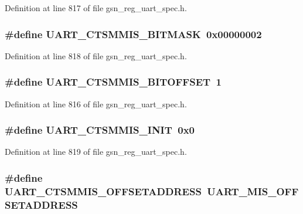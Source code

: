 Definition at line 817 of file gsn\_\-reg\_\-uart\_\-spec.h.

\hypertarget{a00575_a4deb46f192974dde0fb7988e926939ac}{
\subsubsection[{UART\_\-CTSMMIS\_\-BITMASK}]{\setlength{\rightskip}{0pt plus 5cm}\#define UART\_\-CTSMMIS\_\-BITMASK~0x00000002}}
\label{a00575_a4deb46f192974dde0fb7988e926939ac}


Definition at line 818 of file gsn\_\-reg\_\-uart\_\-spec.h.

\hypertarget{a00575_a934d56a5f027b400ddffc09b286ba6f0}{
\subsubsection[{UART\_\-CTSMMIS\_\-BITOFFSET}]{\setlength{\rightskip}{0pt plus 5cm}\#define UART\_\-CTSMMIS\_\-BITOFFSET~1}}
\label{a00575_a934d56a5f027b400ddffc09b286ba6f0}


Definition at line 816 of file gsn\_\-reg\_\-uart\_\-spec.h.

\hypertarget{a00575_aa1332ca2c5dc4adbcba451d13f479a8f}{
\subsubsection[{UART\_\-CTSMMIS\_\-INIT}]{\setlength{\rightskip}{0pt plus 5cm}\#define UART\_\-CTSMMIS\_\-INIT~0x0}}
\label{a00575_aa1332ca2c5dc4adbcba451d13f479a8f}


Definition at line 819 of file gsn\_\-reg\_\-uart\_\-spec.h.

\hypertarget{a00575_a9ccc527d3e1d3ef7b7473bed187b35dd}{
\subsubsection[{UART\_\-CTSMMIS\_\-OFFSETADDRESS}]{\setlength{\rightskip}{0pt plus 5cm}\#define UART\_\-CTSMMIS\_\-OFFSETADDRESS~UART\_\-MIS\_\-OFFSETADDRESS}}
\label{a00575_a9ccc527d3e1d3ef7b7473bed187b35dd}


